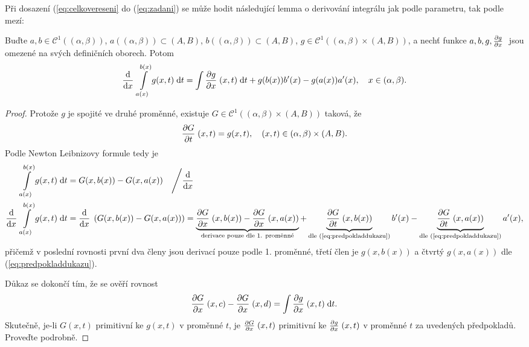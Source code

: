 \begin{remark}
Při dosazení (\ref{eq:celkovereseni} do (\ref{eq:zadani}) se může hodit následující lemma o derivování integrálu jak podle parametru, tak podle mezí:
\end{remark}

\lemma\label{lemma:derivacemezi}

Buďte $a,b\in\mathcal{C}^1((\alpha,\beta))$, $a((\alpha,\beta))\subset (A,B)$, $b((\alpha,\beta))\subset (A,B)$, $g\in\mathcal{C}^1((\alpha,\beta)\times(A,B))$, a nechť funkce $a,b,g,\frac{\partial g}{\partial x} \;$ jsou omezené na svých definičních oborech. Potom
\begin{equation}
    \frac{\mathrm{d} }{\mathrm{d} x} \;\int\limits_{a(x)}^{b(x)}g(x,t)\;\mathrm{d}t = \int\limits\frac{\partial g}{\partial x} \;(x,t)\;\mathrm{d}t + g(b(x))b'(x)-g(a(x))a'(x), \quad x\in(\alpha,\beta).
\end{equation}
\begin{proof}
Protože $g$ je spojité ve druhé proměnné, existuje $G\in \mathcal{C}^1((\alpha,\beta)\times(A,B))$ taková, že 
\begin{equation}
    \frac{\partial G}{\partial t} \;(x,t)=g(x,t),\quad (x,t)\in (\alpha,\beta)\times(A,B).
    \label{eq:predpokladdukazu}
\end{equation}
Podle Newton Leibnizovy formule tedy je 
\begin{equation}
    \begin{split}
        \int\limits_{a(x)}^{b(x)}g(x,t)\;\mathrm{d}t &= G(x,b(x))-G(x,a(x)) \quad \Bigg/ \frac{\mathrm{d} }{\mathrm{d} x} \;\\
        \frac{\mathrm{d} }{\mathrm{d} x} \;\int\limits_{a(x)}^{b(x)}g(x,t)\;\mathrm{d}t &= \frac{\mathrm{d} }{\mathrm{d} x} \; \left(G(x,b(x))-G(x,a(x))\right) = \underbrace{\frac{\partial G}{\partial x} \;(x,b(x))-\frac{\partial G}{\partial x} \;(x,a(x))}_{\text{derivace pouze dle 1. proměnné}}+\underbrace{\frac{\partial G}{\partial t} \;(x,b(x))}_{\text{dle (\ref{eq:predpokladdukazu})}}b'(x)-\underbrace{\frac{\partial G}{\partial t} \;(x,a(x))}_{\text{dle (\ref{eq:predpokladdukazu})}}a'(x),
    \end{split}
\end{equation}
přičemž v poslední rovnosti první dva členy jsou derivací pouze podle 1. proměnné, třetí člen je $g(x,b(x))$ a čtvrtý $g(x,a(x))$ dle (\ref{eq:predpokladdukazu}).

Důkaz se dokončí tím, že se ověří rovnost
\begin{equation}
    \frac{\partial G}{\partial x} \;(x,c)-\frac{\partial G}{\partial x} \;(x,d)=\int\limits\frac{\partial g}{\partial x} \;(x,t)\;\mathrm{d}t.
\end{equation}
Skutečně, je-li $G(x,t)$ primitivní ke $g(x,t)$ v proměnné $t$, je $\frac{\partial G}{\partial x} \;(x,t)$ primitivní ke $\frac{\partial g}{\partial x} \;(x,t)$ v proměnné $t$ za uvedených předpokladů. Proveďte podrobně.
\end{proof}

